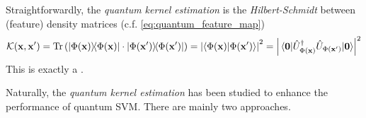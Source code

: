 \begin{definition}\label{def:quantum_kernel}
	Straightforwardly,
	the \emph{quantum kernel estimation} is the \emph{Hilbert-Schmidt}  between (feature) density matrices (c.f. \cref{eq:quantum_feature_map})
	\begin{equation}
		\kernel(\vbx,\vbx') 
		= \Tr\qty(\dyad{\Phi(\vbx)}\cdot \dyad{\Phi(\vbx')})
		= \abs{\braket{\Phi(\vbx)}{\Phi(\vbx')}}^2 = 
		\abs{\matrixel{\vb{0}}{\U^\dagger_{\Phi(\vbx)} \U_{\Phi(\vbx')}}{\vb{0}}}^2
	\end{equation}
	This is exactly a .
\end{definition}
Naturally, the \emph{quantum kernel estimation}
\cite{schuldQuantumMachineLearning2019}
\cite{havlicekSupervisedLearningQuantum2019} 
has been studied to enhance the performance of quantum SVM.
There are mainly two approaches.

